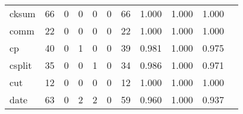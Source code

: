 \begin{longtable}{lp{1.2cm}p{1.2cm}p{1.2cm}p{1.2cm}p{1.2cm}p{1.2cm}p{1.2cm}p{1.2cm}p{1.2cm}p{1.2cm}}
cksum     &                                    66 &                                                  0 &                                                  0 &                                                  0 &                                                  0 &                                                 66 &                                         1.000 &                                              1.000 &                                              1.000 \\
comm      &                                    22 &                                                  0 &                                                  0 &                                                  0 &                                                  0 &                                                 22 &                                         1.000 &                                              1.000 &                                              1.000 \\
cp        &                                    40 &                                                  0 &                                                  1 &                                                  0 &                                                  0 &                                                 39 &                                         0.981 &                                              1.000 &                                              0.975 \\
csplit    &                                    35 &                                                  0 &                                                  0 &                                                  1 &                                                  0 &                                                 34 &                                         0.986 &                                              1.000 &                                              0.971 \\
cut       &                                    12 &                                                  0 &                                                  0 &                                                  0 &                                                  0 &                                                 12 &                                         1.000 &                                              1.000 &                                              1.000 \\
date      &                                    63 &                                                  0 &                                                  2 &                                                  2 &                                                  0 &                                                 59 &                                         0.960 &                                              1.000 &                                              0.937 \\

\end{longtable}
